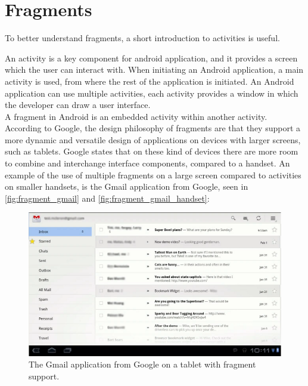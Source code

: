 \section{Fragments}
To better understand fragments, a short introduction to activities is useful.

An activity\cite{AndroidActivity} is a key component for android application, and it provides a screen which the user can interact with. 
When initiating an Android application, a main activity is used, from where the rest of the application is initiated.
An Android application can use multiple activities, each activity provides a window in which the developer can draw a user interface.\\

A fragment in Android is an embedded activity within another activity.
According to Google, the design philosophy of fragments\cite{web:android:fragments} are that they support a more dynamic and versatile design of applications on devices with larger screens, such as tablets.
Google states that on these kind of devices there are more room to combine and interchange interface components, compared to a handset\cite{web:android:fragments}. 
An example of the use of multiple fragments on a large screen compared to activities on smaller handsets, is the Gmail application from Google, seen in \autoref{fig:fragment_gmail} and \autoref{fig:fragment_gmail_handset}:


\begin{figure}[H]
	\centering
		\includegraphics[width=\textwidth]{Images/Implementation/fragment_gmail.png}
			\caption{The Gmail application from Google on a tablet with fragment support.}
	\label{fig:fragment_gmail}
\end{figure}

